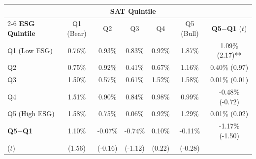 \begin{tabular}{lcccccc}
\toprule
& \multicolumn{5}{c}{\textbf{SAT Quintile}} & \\
\cmidrule(lr){2-6}
\textbf{ESG Quintile} & Q1 (Bear) & Q2 & Q3 & Q4 & Q5 (Bull) & \textbf{Q5$-$Q1} ($t$) \\
\midrule
Q1 (Low ESG) & 0.76\% & 0.93\% & 0.83\% & 0.92\% & 1.87\% & 1.09\% (2.17)** \\
Q2 & 0.75\% & 0.92\% & 0.41\% & 0.67\% & 1.16\% & 0.40\% (0.97) \\
Q3 & 1.50\% & 0.57\% & 0.61\% & 1.52\% & 1.58\% & 0.01\% (0.01) \\
Q4 & 1.51\% & 0.90\% & 0.84\% & 0.98\% & 0.99\% & -0.48\% (-0.72) \\
Q5 (High ESG) & 1.58\% & 0.75\% & 0.06\% & 0.92\% & 1.29\% & 0.01\% (0.02) \\
\midrule
\textbf{Q5$-$Q1} & 1.10\% & -0.07\% & -0.74\% & 0.10\% & -0.11\% & -1.17\% (-1.50) \\
($t$) & (1.56) & (-0.16) & (-1.12) & (0.22) & (-0.28) & \\
\bottomrule
\end{tabular}